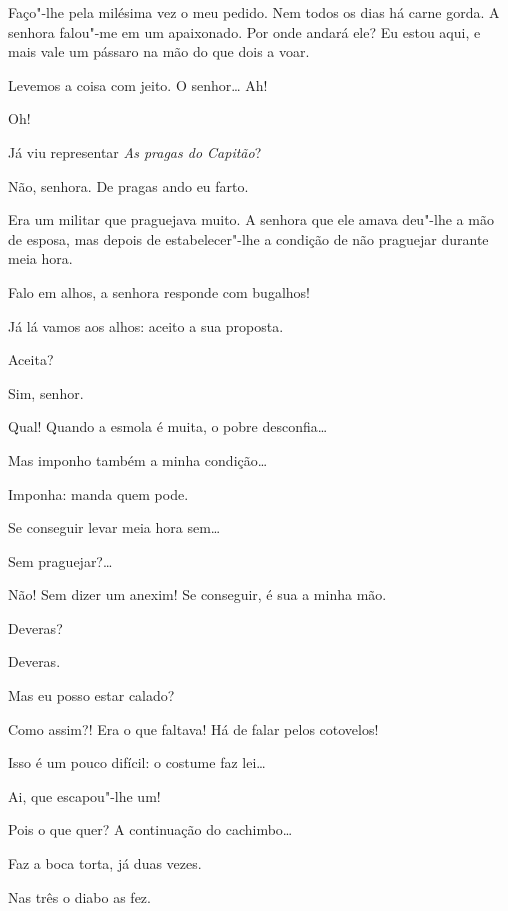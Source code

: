 Faço"-lhe pela milésima vez o meu pedido. Nem todos os dias há carne gorda. A
senhora falou"-me em um apaixonado. Por onde andará ele? Eu estou aqui, e mais
vale um pássaro na mão do que dois a voar.

   Levemos a coisa com jeito.   O
senhor\ldots{}  Ah!

  Oh!

  Já viu representar \textit{As pragas do Capitão}?

  Não, senhora. De pragas ando eu farto.

  Era um militar que praguejava muito. A senhora que ele amava deu"-lhe a mão de esposa, mas depois de estabelecer"-lhe a condição de não praguejar
durante meia hora.

  Falo em alhos, a senhora responde com bugalhos!

  Já lá vamos aos alhos: aceito a sua proposta.

   Aceita?

  Sim, senhor.

   Qual! Quando a esmola é muita, o pobre
desconfia\ldots{}

  Mas imponho também a minha condição\ldots{}

  Imponha: manda quem pode.

  Se conseguir levar meia hora sem\ldots{}

  Sem praguejar?\ldots{}

  Não! Sem dizer um anexim! Se conseguir, é sua a minha mão.

  Deveras?

   Deveras.

  Mas eu posso estar calado?

  Como assim?! Era o que faltava! Há de falar pelos cotovelos!

  Isso é um pouco difícil: o costume faz lei\ldots{}

  Ai, que escapou"-lhe um!

  Pois o que quer? A continuação do cachimbo\ldots{}

  Faz a boca torta, já duas vezes.

  Nas três o diabo as fez.

